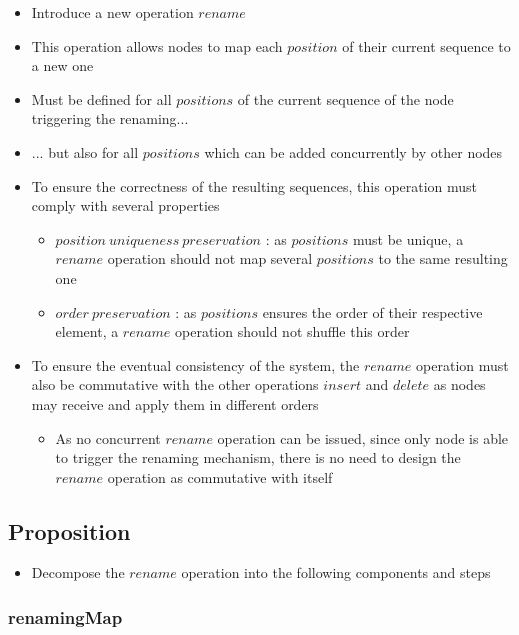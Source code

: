 \documentclass{article}
\begin{document}
\begin{itemize}
    \item Introduce a new operation $rename$
    \item This operation allows nodes to map each $position$ of their current sequence to a new one
    \item Must be defined for all $positions$ of the current sequence of the node triggering the renaming...
    \item ... but also for all $positions$ which can be added concurrently by other nodes
    \item To ensure the correctness of the resulting sequences, this operation must comply with several properties
    \begin{itemize}
        \item $position \ uniqueness \ preservation$ : as $positions$ must be unique, a $rename$ operation should not map several $positions$ to the same resulting one
        \item $order \ preservation$ : as $positions$ ensures the order of their respective element, a $rename$ operation should not shuffle this order
    \end{itemize}
    \item To ensure the eventual consistency of the system, the $rename$ operation must also be commutative with the other operations $insert$ and $delete$ as nodes may receive and apply them in different orders
    \begin{itemize}
        \item As no concurrent $rename$ operation can be issued, since only node is able to trigger the renaming mechanism, there is no need to design the $rename$ operation as commutative with itself
    \end{itemize}
\end{itemize}

\subsection{Proposition}

\begin{itemize}
    \item Decompose the $rename$ operation into the following components and steps
\end{itemize}

\subsubsection{renamingMap}
\end{document}

